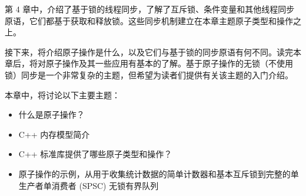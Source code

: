第 4 章中，介绍了基于锁的线程同步，了解了互斥锁、条件变量和其他线程同步原语，它们都基于获取和释放锁。这些同步机制建立在本章主题原子类型和操作之上。

接下来，将介绍原子操作是什么，以及它们与基于锁的同步原语有何不同。读完本章后，将对原子操作及其一些应用有基本的了解。基于原子操作的无锁（不使用锁）同步是一个非常复杂的主题，但希望为读者们提供有关该主题的入门介绍。

本章中，将讨论以下主要主题：

\begin{itemize}
\item
什么是原子操作？

\item
C++ 内存模型简介

\item
C++ 标准库提供了哪些原子类型和操作？

\item
原子操作的示例，从用于收集统计数据的简单计数器和基本互斥锁到完整的单生产者单消费者 (SPSC) 无锁有界队列
\end{itemize}




